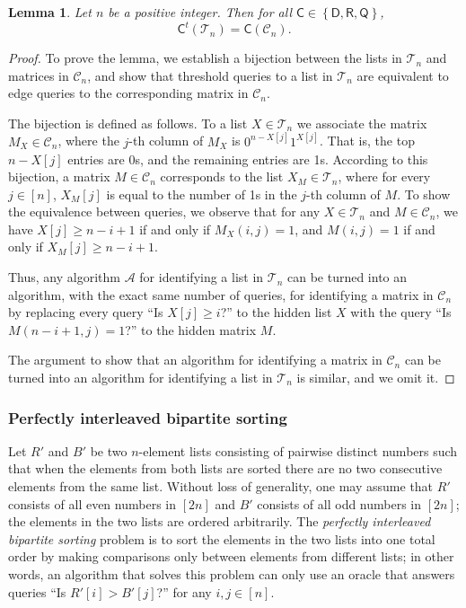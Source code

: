 \documentclass[11pt]{article}
\newcommand{\cA}{\mathcal{A}}
\newcommand{\cC}{\mathcal{C}}
\newcommand{\cT}{\mathcal{T}}
\newcommand{\sC}{\mathsf{C}}
\newcommand{\sD}{\mathsf{D}}
\newcommand{\sQ}{\mathsf{Q}}
\newcommand{\sR}{\mathsf{R}}
\newcommand{\cbra}[1]{\left\{#1\right\}}
\newtheorem{lemma}[theorem]{Lemma}
\begin{document}
\begin{lemma}\label{lem:sorting-thr-equiv-colpermuted}
    Let $n$ be a positive integer. Then for all $\sC \in \cbra{\sD, \sR, \sQ}$,
    $$
    \sC^t(\cT_n) = \sC(\cC_n).
    $$
\end{lemma}
\begin{proof}
    To prove the lemma, we establish a bijection between the lists in $\cT_n$ and matrices in $\cC_n$, and show that threshold queries to a list in $\cT_n$ are equivalent to edge queries to the corresponding matrix in $\cC_n$.

    The bijection is defined as follows. To a list $X \in \cT_n$ we associate the matrix $M_X \in \cC_n$, where the $j$-th column of $M_X$ is $0^{n - X[j]}1^{X[j]}$. That is, the top $n - X[j]$ entries are 0s, and the remaining entries are 1s. According to this bijection, a matrix $M \in \cC_n$ corresponds to the list $X_M \in \cT_n$, where for every $j \in [n]$, $X_M[j]$ is equal to the number of 1s in the $j$-th column of $M$.
    To show the equivalence between queries, we observe that for any $X \in \cT_n$ and $M \in \cC_n$, we have 
    $X[j] \geq n - i + 1$ if and only if $M_X(i, j) = 1$, and
    $M(i, j) = 1$ if and only if $X_M[j] \geq n - i + 1$.
    
    Thus, any algorithm $\cA$ for identifying a list in $\cT_n$ can be turned into an algorithm, with the exact same number of queries, for identifying a matrix in $\cC_n$ by replacing every query ``Is $X[j] \geq i$?'' to the hidden list $X$ with the query ``Is $M(n-i+1,j) = 1$?'' to the hidden matrix $M$.

    The argument to show that an algorithm for identifying a matrix in $\cC_n$ can be turned into an algorithm for identifying a list in $\cT_n$ is similar, and we omit it.
\end{proof}

\subsubsection{Perfectly interleaved bipartite sorting}\label{sec:perfectly-interleaved}
Let $R'$ and $B'$ be two $n$-element lists consisting of pairwise distinct numbers such that when the elements from both lists are sorted there are no two consecutive elements from the same list. Without loss of generality, one may assume that $R'$ consists of all even numbers in $[2n]$ and $B'$ consists of all odd numbers in $[2n]$; the elements in the two lists are ordered arbitrarily. 
The \emph{perfectly interleaved bipartite sorting} problem is to sort the elements in the two lists into one total order by making comparisons only between elements from different lists; in other words, an algorithm that solves this problem can only use an oracle that answers queries 
``Is $R'[i] > B'[j]$?'' for any $i,j \in [n]$. 
\end{document}
